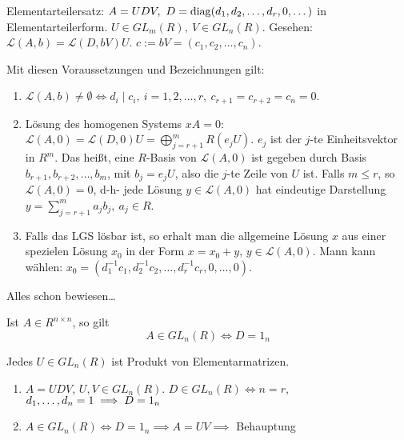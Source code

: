 \documentclass[a4paper,DIV15,BCOR12mm]{article}
\begin{document}
Elementarteilersatz: $A=UDV,\ D=\diag(d_1,d_2,\dotsc,d_r,0,\dotsc)$
in Elementarteilerform. $U\in GL_m(R),\ V\in GL_n(R)$. Gesehen:
$\mathcal{L}(A,b)=\mathcal{L}(D,bV) U$.
$c:=bV=(c_1,c_2,\dotsc,c_n)$.
\begin{satz}\label{satz:LGS}
    Mit diesen Voraussetzungen und Bezeichnungen gilt:
    \begin{enumerate}
        \item $\mathcal{L}(A,b)\neq \emptyset \iff d_i\mid c_i,\
        i=1,2,\dotsc,r,\ c_{r+1}=c_{r+2}=c_n=0$.
        \item Lösung des homogenen Systems $xA=0$:\\
        $\mathcal{L}(A,0)=\mathcal{L}(D,0)U=\bigoplus_{j=r+1}^m R
        (e_jU)$. $e_j$ ist der $j$-te Einheitsvektor in $R^m$. Das
        heißt, eine $R$-Basis von $\mathcal{L}(A,0)$ ist gegeben
        durch Basis $b_{r+1},b_{r+2},\dotsc,b_m$, mit $b_j=e_jU$,
        also die $j$-te Zeile von $U$ ist. Falls $m\leq r$, so
        $\mathcal{L}(A,0)=0$, d-h- jede Lösung
        $y\in\mathcal{L}(A,0)$
        hat eindeutige Darstellung $y=\sum_{j=r+1}^m a_j b_j,\ a_j
        \in R$.
        \item Falls das LGS lösbar ist, so erhalt man die allgemeine
        Lösung $x$ aus einer spezielen Lösung $x_0$ in der Form
        $x=x_0+y$, $y\in \mathcal{L}(A,0)$. Mann kann wählen:
        $x_0=(d_1^{-1} c_1,d_2^{-1} c_2,\dotsc,d_r^{-1}
        c_r,0,\dotsc,0)$.
    \end{enumerate}
\end{satz}
\begin{beweis}
    Alles schon bewiesen\dots
\end{beweis}

\begin{bemerkungen}
\item Ist $A\in R^{n\times n}$, so gilt
\[ A\in GL_n(R) \iff D=1_n \]
\item Jedes $U\in GL_n(R)$ ist Produkt von Elementarmatrizen.
\end{bemerkungen}

\begin{beweis}
\begin{enumerate}
\item $A=UDV$, $U,V \in GL_n(R)$. $D\in GL_n(R) \iff n=r$, $d_1,\ldots,d_n=1\implies D=1_n$
\item $A\in GL_n(R) \iff D=1_n \implies A=UV \implies$ Behauptung
\end{enumerate}
\end{beweis}
\end{document}
